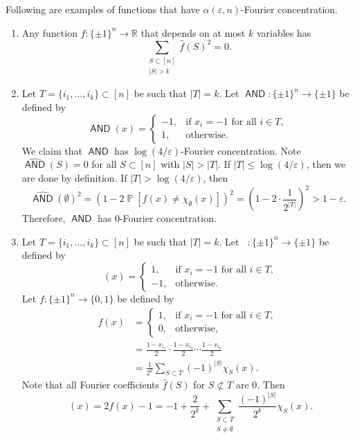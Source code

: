 \documentclass[letterpaper, reqno,11pt]{article}
\newcommand{\RR}{\mathbb{R}}
\newcommand{\PP}{\mathop{{}\mathbb{P}}}
\DeclareMathOperator{\AND}{\mathsf{AND}}
\DeclareMathOperator{\ANDbar}{\mathsf{\overline{AND}}}
\begin{document}
Following are examples of functions that have $\alpha(\varepsilon, n)$-Fourier concentration.
\begin{enumerate}[label=(\roman*)]
  \item Any function $f : \{ \pm 1 \}^n \to \RR$ that depends on at most $k$ variables has
  $$ \sum_{\substack{S \subset [n] \\ |S| > k}} \hat{f}(S)^2 = 0. $$
  \item Let $T = \{ i_1, \ldots, i_k \} \subset [n]$ be such that $|T| = k$. Let $\AND : \{ \pm 1 \}^n \to \{ \pm 1 \}$ be defined by
  $$ \AND(x) = \left\{
    \begin{array}{ll}
      -1, & \text{if $x_i = -1$ for all $i \in T$}, \\
      1, & \text{otherwise}.
    \end{array}
  \right. $$
  We claim that $\AND$ has $\log(4/\varepsilon)$-Fourier concentration. Note $\widehat{\AND}(S) = 0$ for all $S \subset [n]$ with $|S| > |T|$. If $|T| \leq \log(4/\varepsilon)$, then we are done by definition. If $|T| > \log (4/\varepsilon)$, then
  $$ \widehat{\AND}(\emptyset)^2 = \left(1 - 2\PP\left[f(x) \neq \chi_\emptyset(x)\right]\right)^2 = \left(1 - 2 \cdot \frac{1}{2^{|T|}}\right)^2 > 1 - \varepsilon. $$
  Therefore, $\AND$ has $0$-Fourier concentration.
  \item Let $T = \{ i_1, \ldots, i_k \} \subset [n]$ be such that $|T| = k$. Let $\ANDbar : \{ \pm 1 \}^n \to \{ \pm 1 \}$ be defined by
  $$ \ANDbar(x) = \left\{
    \begin{array}{ll}
      1, & \text{if $x_i = -1$ for all $i \in T$}, \\
      -1, & \text{otherwise}.
    \end{array}
  \right. $$
  Let $f : \{ \pm 1 \}^n \to \{ 0, 1 \}$ be defined by
  \begin{align*}
    f(x) &= \left\{
      \begin{array}{ll}
        1, & \text{if $x_i = -1$ for all $i \in T$}, \\
        0, & \text{otherwise},
      \end{array}
    \right. \\
    &= \frac{1 - x_{i_1}}{2} \cdot \frac{1 - x_{i_2}}{2} \cdots \frac{1 - x_{i_k}}{2} \\
    &= \frac{1}{2^k} \sum_{S \subset T} (-1)^{|S|} \chi_S(x).
  \end{align*}
  Note that all Fourier coefficients $\hat{f}(S)$ for $S \not \subset T$ are $0$. Then
  $$ \ANDbar(x) = 2f(x) - 1 = -1 + \frac{2}{2^k} + \sum_{\substack{S \subset T \\ S \neq \emptyset}} \frac{(-1)^{|S|}}{2^k} \chi_S(x). $$

\end{enumerate}
\end{document}
